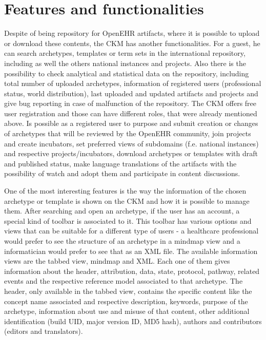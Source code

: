 \documentclass[mim_thesis.tex]{subfiles}
\begin{document}
\section{Features and functionalities}
Despite of being repository for OpenEHR artifacts, where it is possible to upload or download these contents, the CKM has another functionalities. For a guest, he can search archetypes, templates or term sets in the international repository, including as well the others national instances and projects. Also there is the possibility to check analytical and statistical data on the repository, including total number of uploaded archetypes, information of registered users (professional status, world distribution), last uploaded and updated artifacts and projects and give bug reporting in case of malfunction of the repository. The CKM offers free user registration and those can have different roles, that were already mentioned above. Is possible as a registered user to purpose and submit creation or changes of archetypes that will be reviewed by the OpenEHR community, join projects and create incubators, set preferred views of subdomains (f.e. national instances) and respective projects/incubators, download archetypes or templates with draft and published status, make language translations of the artifacts with the possibility of watch and adopt them and participate in content discussions. \par
One of the most interesting features is the way the information of the chosen archetype or template is shown on the CKM and how it is possible to manage them. After searching and open an archetype, if the user has an account, a special kind of toolbar is associated to it. This toolbar has various options and views that can be suitable for a different type of users - a healthcare professional would prefer to see the structure of an archetype in a mindmap view and a informatician would prefer to see that as an XML file. The available information views are the tabbed view, mindmap and XML. Each one of them gives information about the header, attribution, data, state, protocol, pathway, related events and the respective reference model associated to that archetype. The header, only available in the tabbed view, contains the specific content like the concept name associated and respective description, keywords, purpose of the archetype, information about use and misuse of that content, other additional identification (build UID, major version ID, MD5 hash), authors and contributors (editors and translators). 
\end{document}
